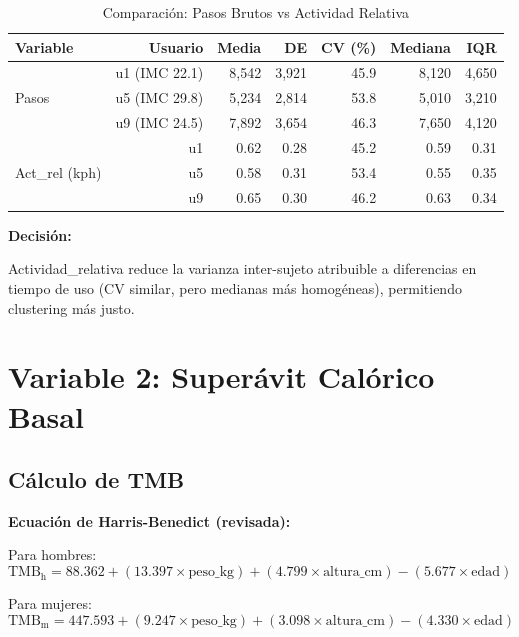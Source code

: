 \documentclass[12pt,letterpaper,twoside]{report}
\begin{document}
\begin{table}[H]
\centering
\caption{Comparación: Pasos Brutos vs Actividad Relativa}
\label{tab:activity_comparison}
\begin{tabular}{@{}lrrrrrr@{}}
\toprule
\textbf{Variable} & \textbf{Usuario} & \textbf{Media} & \textbf{DE} & \textbf{CV (\%)} & \textbf{Mediana} & \textbf{IQR} \\
\midrule
\multirow{3}{*}{Pasos} 
    & u1 (IMC 22.1) & 8,542 & 3,921 & 45.9 & 8,120 & 4,650 \\
    & u5 (IMC 29.8) & 5,234 & 2,814 & 53.8 & 5,010 & 3,210 \\
    & u9 (IMC 24.5) & 7,892 & 3,654 & 46.3 & 7,650 & 4,120 \\
\midrule
\multirow{3}{*}{Act\_rel (kph)} 
    & u1 & 0.62 & 0.28 & 45.2 & 0.59 & 0.31 \\
    & u5 & 0.58 & 0.31 & 53.4 & 0.55 & 0.35 \\
    & u9 & 0.65 & 0.30 & 46.2 & 0.63 & 0.34 \\
\bottomrule
\end{tabular}
\end{table}

\begin{decisionbox}
\textbf{Decisión:}

Actividad\_relativa reduce la varianza inter-sujeto atribuible a diferencias en tiempo de uso (CV similar, pero medianas más homogéneas), permitiendo clustering más justo.
\end{decisionbox}

\section{Variable 2: Superávit Calórico Basal}

\subsection{Cálculo de TMB}

\begin{estadisticobox}
\textbf{Ecuación de Harris-Benedict (revisada):}

Para hombres:
\begin{equation}
\text{TMB}_{\text{h}} = 88.362 + (13.397 \times \text{peso\_kg}) + (4.799 \times \text{altura\_cm}) - (5.677 \times \text{edad})
\end{equation}

Para mujeres:
\begin{equation}
\text{TMB}_{\text{m}} = 447.593 + (9.247 \times \text{peso\_kg}) + (3.098 \times \text{altura\_cm}) - (4.330 \times \text{edad})
\end{equation}
\end{estadisticobox}
\end{document}
